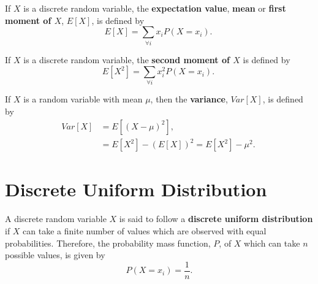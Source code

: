 \begin{defn} \label{mod2:defn:Discrete:Expectation}
	If $X$ is a discrete random variable, the \textbf{expectation value}, \textbf{mean} or \textbf{first moment of $X$}, $E[X]$, is defined by
	\begin{equation}
	E[X]= \sum_{\forall i} x_i P(X=x_i). \label{mod2:eq:Discrete:Expectation}\ 
	\end{equation}
\end{defn}

\begin{defn} \label{mod2:defn:Discrete:SecondMoment}
	If $X$ is a discrete random variable, the \textbf{second moment of $X$} is defined by
	\begin{equation}
	E[X^2] = \sum_{\forall i} x_i^2 P(X=x_i). \label{mod2:eq:Discrete:SecondMoment} \ 
	\end{equation}
\end{defn}

\begin{defn}\label{mod2:defn:Discrete:Variance}
	If $X$ is a random variable with mean $\mu$, then the \textbf{variance}, $Var[X]$, is defined by
	\begin{align}
	Var[X] &= E[(X-\mu)^2],  \label{mod2:eq:Discrete:Variance:1}  \\
	&= E[X^2] - (E[X])^2  = E[X^2] - \mu^2 . \label{mod2:eq:Discrete:Variance:2} \
	\end{align}
\end{defn}



\section{Discrete Uniform Distribution} \label{mo2:section:DiscreteUniform}

\begin{defn} \label{mod2:defn:DiscreteUniform}
	A discrete random variable $X$ is said to follow a \textbf{discrete uniform distribution} if $X$ can take a finite number of values which are observed with equal probabilities. Therefore, the probability mass function, $P$, of $X$ which can take $n$ possible values,  is given by
	\begin{equation}
		P(X = x_i) = \frac{1}{n} \label{mod2:eq:DiscreteUniform}.
	\end{equation}
\end{defn}

